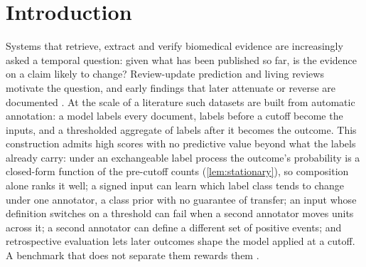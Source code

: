 \documentclass[11pt]{article}
\begin{document}
\section{Introduction}
\label{sec:intro}
Systems that retrieve, extract and verify biomedical evidence are increasingly asked a temporal
question: given what has been published so far, is the evidence on a claim likely to change?
Review-update prediction \citep{Bashir2019,Bashir2021,AlharbiStevenson2026} and living reviews
\citep{Elliott2014,Nevill2025} motivate the question, and early findings that later attenuate or
reverse are documented \citep{Ioannidis2005JAMA,IoannidisTrikalinos2005,Prasad2013}. At the scale of a literature such
datasets are built from automatic annotation: a model labels every document, labels before a cutoff become the inputs, and a thresholded aggregate of labels after it becomes the outcome.
This construction admits high scores with no predictive value beyond what the labels already
carry: under an exchangeable label process the outcome's probability is a closed-form function of
the pre-cutoff counts (\cref{lem:stationary}), so composition alone ranks it well; a signed input can
learn which label class tends to change under one annotator, a class prior with no guarantee of
transfer; an input whose definition switches on a threshold can fail when a second annotator moves
units across it; a second annotator can define a different set of positive events; and retrospective
evaluation lets later outcomes shape the model applied at a cutoff. A benchmark that
does not separate them rewards them \citep{Gururangan2018,Poliak2018,McCoy2019}.
\end{document}

